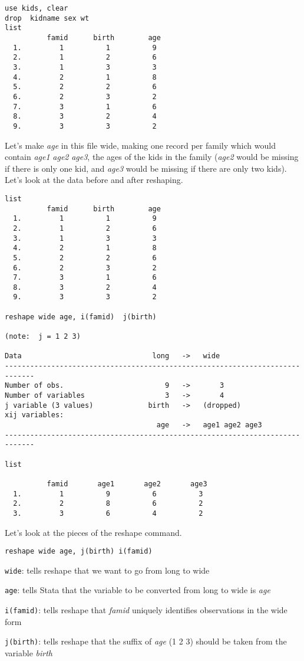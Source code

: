 \begin{lstlisting}
use kids, clear
drop  kidname sex wt
list
          famid      birth        age
  1.         1          1          9
  2.         1          2          6
  3.         1          3          3
  4.         2          1          8
  5.         2          2          6
  6.         2          3          2
  7.         3          1          6
  8.         3          2          4
  9.         3          3          2
\end{lstlisting}

Let's make \textit{age} in this file wide, making one record per family which would contain \textit{age1} \textit{age2} \textit{age3}, the ages of the kids in the family (\textit{age2} would be missing if there is only one kid, and \textit{age3} would be missing if there are only two kids). Let's look at the data before and after reshaping.

\begin{lstlisting}
list
          famid      birth        age
  1.         1          1          9
  2.         1          2          6
  3.         1          3          3
  4.         2          1          8
  5.         2          2          6
  6.         2          3          2
  7.         3          1          6
  8.         3          2          4
  9.         3          3          2

reshape wide age, i(famid)  j(birth)

(note:  j = 1 2 3)

Data                               long   ->   wide
-----------------------------------------------------------------------------
Number of obs.                        9   ->       3
Number of variables                   3   ->       4
j variable (3 values)             birth   ->   (dropped)
xij variables:
                                    age   ->   age1 age2 age3
-----------------------------------------------------------------------------

list

          famid       age1       age2       age3
  1.         1          9          6          3
  2.         2          8          6          2
  3.         3          6          4          2
\end{lstlisting}

Let's look at the pieces of the reshape command.

\begin{lstlisting}
reshape wide age, j(birth) i(famid)
\end{lstlisting}
\begin{compactitem}
\item \lstinline{wide}: tells reshape that we want to go from long to wide
\item \lstinline{age}: tells Stata that the variable to be converted from long to wide is \textit{age}
\item \lstinline{i(famid)}: tells reshape that \textit{famid} uniquely identifies observations in the wide form
\item \lstinline{j(birth)}: tells reshape that the suffix of \textit{age} (1 2 3) should be taken from the variable \textit{birth}
\end{compactitem}

